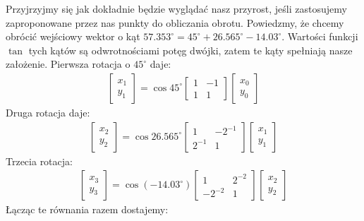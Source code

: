 \documentclass[12pt]{extarticle}
\theoremstyle{remark}
\theoremstyle{definition}
\theoremstyle{definition}
\begin{document}
Przyjrzyjmy się jak dokładnie będzie wyglądać nasz przyrost, jeśli zastosujemy zaproponowane przez nas punkty do obliczania obrotu. Powiedzmy, że chcemy obrócić wejściowy wektor o kąt $57.353^{\circ} = 45^{\circ} + 26.565^{\circ} - 14.03^{\circ}$. Wartości funkcji $\tan$ tych kątów są odwrotnościami potęg dwójki, zatem te kąty spełniają nasze założenie. Pierwsza rotacja o $45^{\circ}$ daje:
\begin{align}
  \begin{bmatrix}
    x_1 \\ y_1
  \end{bmatrix}
  = \cos 45^{\circ}
  \begin{bmatrix}
    1 & -1 \\
    1 & 1
  \end{bmatrix}
  \begin{bmatrix}
    x_0 \\ y_0
  \end{bmatrix}
\end{align}
Druga rotacja daje:
\begin{align}
  \begin{bmatrix}
    x_2 \\ y_2
  \end{bmatrix}
  = \cos 26.565^{\circ}
  \begin{bmatrix}
    1      & -2^{-1} \\
    2^{-1} & 1
  \end{bmatrix}
  \begin{bmatrix}
    x_1 \\ y_1
  \end{bmatrix}
\end{align}
Trzecia rotacja:
\begin{align}
  \begin{bmatrix}
    x_3 \\ y_3
  \end{bmatrix}
  = \cos(-14.03^{\circ})
  \begin{bmatrix}
    1      & 2^{-2} \\
    -2^{-2} & 1
  \end{bmatrix}
  \begin{bmatrix}
    x_2 \\ y_2
  \end{bmatrix}
\end{align}
Łącząc te równania razem dostajemy:
\end{document}
